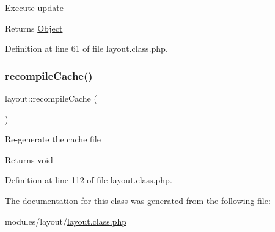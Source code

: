 Execute update \begin{DoxyReturn}{Returns}
\hyperlink{classObject}{Object} 
\end{DoxyReturn}


Definition at line 61 of file layout.\+class.\+php.

\hypertarget{classlayout_ada8199439f32bd6bbb63ce85a52a7c61}{}\label{classlayout_ada8199439f32bd6bbb63ce85a52a7c61} 
\subsubsection{\texorpdfstring{recompile\+Cache()}{recompileCache()}}
{\footnotesize\ttfamily layout\+::recompile\+Cache (\begin{DoxyParamCaption}{ }\end{DoxyParamCaption})}

Re-\/generate the cache file \begin{DoxyReturn}{Returns}
void 
\end{DoxyReturn}


Definition at line 112 of file layout.\+class.\+php.



The documentation for this class was generated from the following file\+:\begin{DoxyCompactItemize}
\item 
modules/layout/\hyperlink{layout_8class_8php}{layout.\+class.\+php}\end{DoxyCompactItemize}
